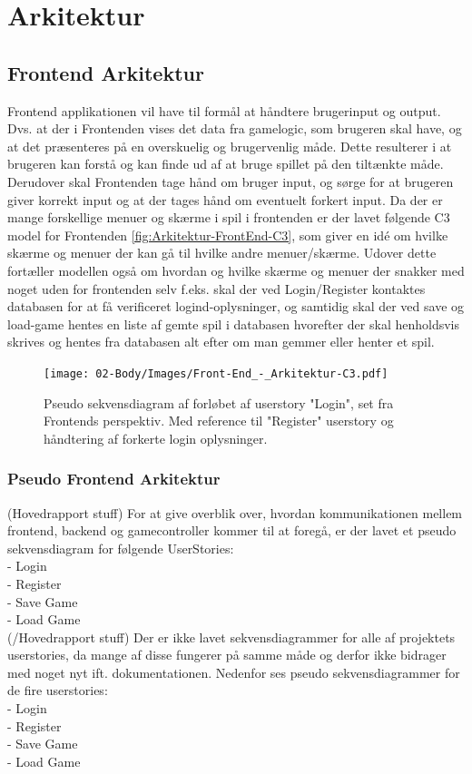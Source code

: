 \section{Arkitektur}
\subsection{Frontend Arkitektur}

Frontend applikationen vil have til formål at håndtere brugerinput og output. Dvs. at der i Frontenden vises det data fra gamelogic, som brugeren skal have, og at det præsenteres på en overskuelig og brugervenlig måde. Dette resulterer i at brugeren kan forstå og kan finde ud af at bruge spillet på den tiltænkte måde.
Derudover skal Frontenden tage hånd om bruger input, og sørge for at brugeren giver korrekt input og at der tages hånd om eventuelt forkert input.
Da der er mange forskellige menuer og skærme i spil i frontenden er der lavet følgende C3 model for Frontenden \autoref{fig:Arkitektur-FrontEnd-C3}, som giver en idé om hvilke skærme og menuer der kan gå til hvilke andre menuer/skærme. Udover dette fortæller modellen også om hvordan og hvilke skærme og menuer der snakker med noget uden for frontenden selv f.eks. skal der ved Login/Register kontaktes databasen for at få verificeret logind-oplysninger, og samtidig skal der ved save og load-game hentes en liste af gemte spil i databasen hvorefter der skal henholdsvis skrives og hentes fra databasen alt efter om man gemmer eller henter et spil.

\begin{figure}[h]
\centering
\texttt{[image: 02-Body/Images/Front-End\_-\_Arkitektur-C3.pdf]}
\caption{Pseudo sekvensdiagram af forløbet af userstory "Login", set fra Frontends perspektiv. Med reference til "Register" userstory og håndtering af forkerte login oplysninger.}
\label{fig:Arkitektur-FrontEnd-C3}
\end{figure}

\subsubsection{Pseudo Frontend Arkitektur}
(Hovedrapport stuff)
For at give overblik over, hvordan kommunikationen mellem frontend, backend og gamecontroller kommer til at foregå, er der lavet et pseudo sekvensdiagram for følgende UserStories:
\\
- Login\\
- Register\\
- Save Game\\
- Load Game\\
(/Hovedrapport stuff)
Der er ikke lavet sekvensdiagrammer for alle af projektets userstories, da mange af disse fungerer på samme måde og derfor ikke bidrager med noget nyt ift. dokumentationen.
Nedenfor ses pseudo sekvensdiagrammer for de fire userstories:\\
- Login\\
- Register\\
- Save Game\\
- Load Game\\

